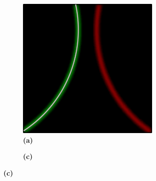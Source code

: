 \begin{figure}[ht]
    \begin{subfigure}{\textwidth}
        \begin{subfigure}{.33\textwidth}
            \centering
            \includegraphics[scale=.06]{figures/Coaxing/SingleLine2.png}
            \caption*{\textbf{(a)}}
        \end{subfigure}
        \begin{subfigure}{.65\textwidth}
            \centering
            
            \caption*{\textbf{(c)}}
        \end{subfigure}
    \end{subfigure}
    \begin{subfigure}{\textwidth}
        \begin{subfigure}{.33\textwidth}
            \centering

\end{subfigure}
\end{subfigure}
\end{figure}
